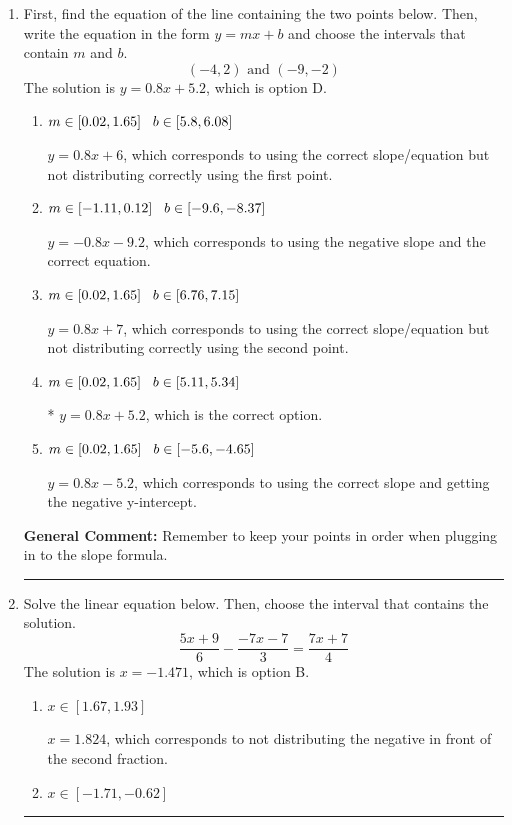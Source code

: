 \documentclass{extbook}[14pt]
\newcommand{\litem}[1]{\item #1

\rule{\textwidth}{0.4pt}}
\begin{document}
\begin{enumerate}\litem{
First, find the equation of the line containing the two points below. Then, write the equation in the form $ y=mx+b $ and choose the intervals that contain $m$ and $b$.
\[ (-4, 2) \text{ and } (-9, -2) \]The solution is \( y = 0.8x + 5.2 \), which is option D.\begin{enumerate}[label=\Alph*.]
\item \( m \in [0.02, 1.65] \hspace*{3mm} b \in [5.8, 6.08] \)

 $y = 0.8x + 6$, which corresponds to using the correct slope/equation but not distributing correctly using the first point.
\item \( m \in [-1.11, 0.12] \hspace*{3mm} b \in [-9.6, -8.37] \)

 $y = -0.8x -9.2$, which corresponds to using the negative slope and the correct equation.
\item \( m \in [0.02, 1.65] \hspace*{3mm} b \in [6.76, 7.15] \)

 $y = 0.8x + 7$, which corresponds to using the correct slope/equation but not distributing correctly using the second point.
\item \( m \in [0.02, 1.65] \hspace*{3mm} b \in [5.11, 5.34] \)

* $y = 0.8x + 5.2$, which is the correct option.
\item \( m \in [0.02, 1.65] \hspace*{3mm} b \in [-5.6, -4.65] \)

 $y = 0.8x -5.2$, which corresponds to using the correct slope and getting the negative y-intercept.
\end{enumerate}

\textbf{General Comment:} Remember to keep your points in order when plugging in to the slope formula.
}
\litem{
Solve the linear equation below. Then, choose the interval that contains the solution.
\[ \frac{5x + 9}{6} - \frac{-7x -7}{3} = \frac{7x + 7}{4} \]The solution is \( x = -1.471 \), which is option B.\begin{enumerate}[label=\Alph*.]
\item \( x \in [1.67, 1.93] \)

 $x = 1.824$, which corresponds to not distributing the negative in front of the second fraction.
\item \( x \in [-1.71, -0.62] \)


\end{enumerate}}
\end{enumerate}
\end{document}
